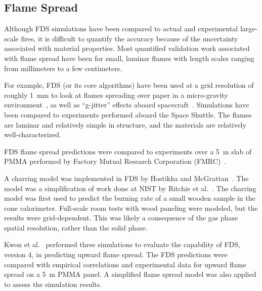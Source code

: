 \subsection{Flame Spread}
\label{flame spread}

Although FDS simulations have been compared to actual and experimental large-scale fires, it is difficult to quantify the accuracy because of the uncertainty associated with material properties. Most quantified validation work associated with flame spread have been for small, laminar flames with length scales ranging from millimeters to a few centimeters.

For example, FDS (or its core algorithms) have been used at a grid resolution of roughly 1~mm to look at flames spreading over paper in a micro-gravity environment~\cite{McGrattan:CF1996,Kashiwagi:CS1996,Mell:CS98,Mell:CS00,Prasad:CS2002,Nakamura:CF2002}, as well as ``g-jitter'' effects aboard spacecraft~\cite{Mell:g-jitter}. Simulations have been compared to experiments performed aboard the Space Shuttle. The flames are laminar and relatively simple in structure, and the materials are relatively well-characterized.

FDS flame spread predictions were compared to experiments over a 5~m slab of PMMA performed by Factory Mutual Research Corporation (FMRC)~\cite{Ma:2,Ma:3}.

A  charring model  was  implemented in  FDS  by Hostikka  and McGrattan~\cite{Hostikka:2}. The model was a simplification of work done at NIST by Ritchie et al.~\cite{Ritchie:1}. The charring model was first used to predict the burning rate of a small wooden sample in the cone calorimeter. Full-scale room tests with wood paneling were modeled, but the results were grid-dependent. This was likely a consequence of the gas phase spatial resolution, rather than the solid phase.

Kwon et al.~\cite{Kwon:Fire_Technology_2007} performed three simulations to evaluate the capability of FDS, version 4, in predicting upward flame spread. The FDS predictions were compared with empirical correlations and experimental data for upward flame spread on a 5~m PMMA panel. A simplified flame spread model was also applied to assess the simulation results.

